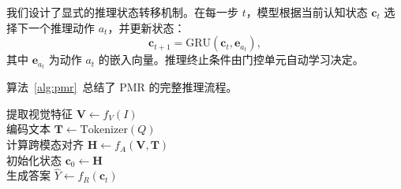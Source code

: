 我们设计了显式的推理状态转移机制。在每一步 $t$，模型根据当前认知状态 $\mathbf{c}_t$ 选择下一个推理动作 $a_t$，并更新状态：
\begin{equation}
  \mathbf{c}_{t+1} = \text{GRU}(\mathbf{c}_t, \mathbf{e}_{a_t}),
\end{equation}
其中 $\mathbf{e}_{a_t}$ 为动作 $a_t$ 的嵌入向量。推理终止条件由门控单元自动学习决定。

算法~\ref{alg:pmr}~总结了 PMR 的完整推理流程。

\begin{algorithm}[htbp]
\caption{渐进式多模态推理（PMR）}
\label{alg:pmr}
提取视觉特征 $\mathbf{V} \leftarrow f_V(I)$\\
编码文本 $\mathbf{T} \leftarrow \text{Tokenizer}(Q)$\\
计算跨模态对齐 $\mathbf{H} \leftarrow f_A(\mathbf{V}, \mathbf{T})$\\
初始化状态 $\mathbf{c}_0 \leftarrow \mathbf{H}$\\
生成答案 $\hat{Y} \leftarrow f_R(\mathbf{c}_t)$\\
\end{algorithm}
